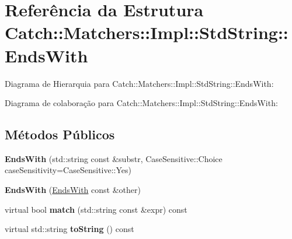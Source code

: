\hypertarget{structCatch_1_1Matchers_1_1Impl_1_1StdString_1_1EndsWith}{}\section{Referência da Estrutura Catch\+:\+:Matchers\+:\+:Impl\+:\+:Std\+String\+:\+:Ends\+With}
\label{structCatch_1_1Matchers_1_1Impl_1_1StdString_1_1EndsWith}


Diagrama de Hierarquia para Catch\+:\+:Matchers\+:\+:Impl\+:\+:Std\+String\+:\+:Ends\+With\+:


Diagrama de colaboração para Catch\+:\+:Matchers\+:\+:Impl\+:\+:Std\+String\+:\+:Ends\+With\+:
\subsection*{Métodos Públicos}
\begin{DoxyCompactItemize}
\item 
{\bfseries Ends\+With} (std\+::string const \&substr, Case\+Sensitive\+::\+Choice case\+Sensitivity=Case\+Sensitive\+::\+Yes)\hypertarget{structCatch_1_1Matchers_1_1Impl_1_1StdString_1_1EndsWith_ae90c02ff06c9dd5e62218b2b521e8cab}{}\label{structCatch_1_1Matchers_1_1Impl_1_1StdString_1_1EndsWith_ae90c02ff06c9dd5e62218b2b521e8cab}

\item 
{\bfseries Ends\+With} (\hyperlink{structCatch_1_1Matchers_1_1Impl_1_1StdString_1_1EndsWith}{Ends\+With} const \&other)\hypertarget{structCatch_1_1Matchers_1_1Impl_1_1StdString_1_1EndsWith_a9321aac07fb17613a7993e99003b3be2}{}\label{structCatch_1_1Matchers_1_1Impl_1_1StdString_1_1EndsWith_a9321aac07fb17613a7993e99003b3be2}

\item 
virtual bool {\bfseries match} (std\+::string const \&expr) const \hypertarget{structCatch_1_1Matchers_1_1Impl_1_1StdString_1_1EndsWith_ad0e03d7f54ffa5859f84faebccf11e76}{}\label{structCatch_1_1Matchers_1_1Impl_1_1StdString_1_1EndsWith_ad0e03d7f54ffa5859f84faebccf11e76}

\item 
virtual std\+::string {\bfseries to\+String} () const \hypertarget{structCatch_1_1Matchers_1_1Impl_1_1StdString_1_1EndsWith_a54715c94c215a1fc5fb6336acf52eb06}{}\label{structCatch_1_1Matchers_1_1Impl_1_1StdString_1_1EndsWith_a54715c94c215a1fc5fb6336acf52eb06}

\end{DoxyCompactItemize}
